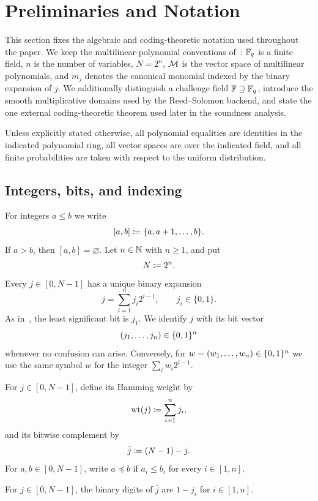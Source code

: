 \section{Preliminaries and Notation}
\label{sec:preliminaries}

This section fixes the algebraic and coding-theoretic notation used throughout the paper.  We keep the multilinear-polynomial conventions of~\cite{MkhidaIguider26}: $\mathbb{F}_q$ is a finite field, $n$ is the number of variables, $N=2^n$, $\mathcal{M}$ is the vector space of multilinear polynomials, and $m_j$ denotes the canonical monomial indexed by the binary expansion of $j$.  We additionally distinguish a challenge field $\mathbb{F}\supseteq\mathbb{F}_q$, introduce the smooth multiplicative domains used by the Reed--Solomon backend, and state the one external coding-theoretic theorem used later in the soundness analysis.

Unless explicitly stated otherwise, all polynomial equalities are identities in the indicated polynomial ring, all vector spaces are over the indicated field, and all finite probabilities are taken with respect to the uniform distribution.

\subsection{Integers, bits, and indexing}
\label{sec:preliminaries-bits}

For integers $a\le b$ we write
\[
  [a,b]\coloneqq\{a,a+1,\ldots,b\}.
\]
If $a>b$, then $[a,b]=\varnothing$.  Let $n\in\mathbb{N}$ with $n\ge1$, and put
\[
  N\coloneqq 2^n.
\]
Every $j\in[0,N-1]$ has a unique binary expansion
\begin{equation}
  j=\sum_{i=1}^{n} j_i2^{i-1},
  \qquad j_i\in\{0,1\}.
  \label{eq:binary-expansion}
\end{equation}
As in~\cite{MkhidaIguider26}, the least significant bit is $j_1$.  We identify $j$ with its bit vector
\[
  (j_1,\ldots,j_n)\in\{0,1\}^n
\]
whenever no confusion can arise.  Conversely, for $w=(w_1,\ldots,w_n)\in\{0,1\}^n$ we use the same symbol $w$ for the integer $\sum_iw_i2^{i-1}$.

For $j\in[0,N-1]$, define its Hamming weight by
\[
  \operatorname{wt}(j)\coloneqq\sum_{i=1}^{n}j_i,
\]
and its bitwise complement by
\[
  \bar j\coloneqq (N-1)-j.
\]
For $a,b\in[0,N-1]$, write $a\preceq b$ if $a_i\le b_i$ for every $i\in[1,n]$.

\begin{lemma}
\label{lem:complement-bits}
For $j\in[0,N-1]$, the binary digits of $\bar j$ are $1-j_i$ for $i\in[1,n]$.
\end{lemma}

